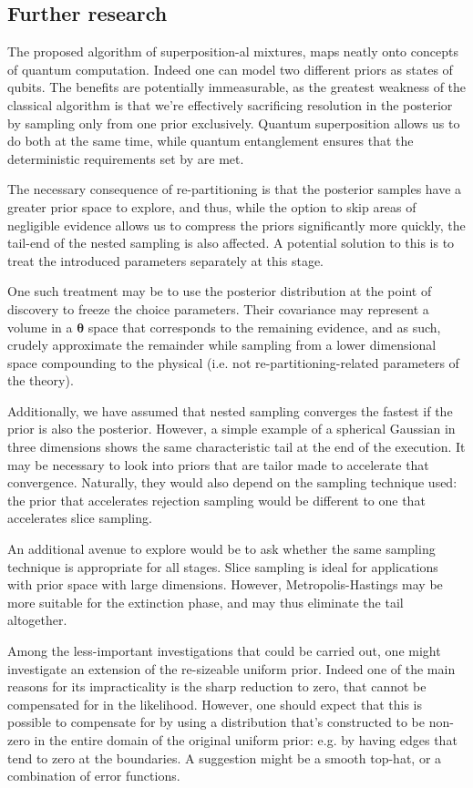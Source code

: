\documentclass[usenatbib]{mnras}
\begin{document}
\subsection{Further research}
\label{sec:orge1df9fd}
The proposed algorithm of superposition-al mixtures, maps neatly
onto concepts of quantum computation. Indeed one can model two
different priors as states of qubits. The benefits are potentially
immeasurable, as the greatest weakness of the classical algorithm
is that we're effectively sacrificing resolution in the posterior
by sampling only from one prior exclusively. Quantum superposition
allows us to do both at the same time, while quantum entanglement
ensures that the deterministic requirements set by
\citeauthor{Skilling2006} are met.

The necessary consequence of re-partitioning is that the posterior
samples have a greater prior space to explore, and thus, while the
option to skip areas of negligible evidence allows us to compress
the priors significantly more quickly, the tail-end of the nested
sampling is also affected. A potential solution to this is to treat
the introduced parameters separately at this stage.

One such treatment may be to use the posterior distribution at the
point of discovery to freeze the choice parameters. Their
covariance may represent a volume in a \(\bm{\theta}\) space that
corresponds to the remaining evidence, and as such, crudely
approximate the remainder while sampling from a lower dimensional
space compounding to the physical (i.e. not re-partitioning-related
parameters of the theory).

Additionally, we have assumed that nested sampling converges the
fastest if the prior is also the posterior. However, a simple
example of a spherical Gaussian in three dimensions shows the same
characteristic tail at the end of the execution. It may be
necessary to look into priors that are tailor made to accelerate
that convergence. Naturally, they would also depend on the sampling
technique used: the prior that accelerates rejection sampling would
be different to one that accelerates slice sampling.

An additional avenue to explore would be to ask whether the same
sampling technique is appropriate for all stages. Slice sampling is
ideal for applications with prior space with large
dimensions. However, Metropolis-Hastings may be more suitable for
the extinction phase, and may thus eliminate the tail altogether.

Among the less-important investigations that could be carried out,
one might investigate an extension of the re-sizeable uniform
prior. Indeed one of the main reasons for its impracticality is the
sharp reduction to zero, that cannot be compensated for in the
likelihood. However, one should expect that this is possible to
compensate for by using a distribution that's constructed to be
non-zero in the entire domain of the original uniform prior:
e.g. by having edges that tend to zero at the boundaries. A
suggestion might be a smooth top-hat, or a combination of error
functions.
\end{document}
